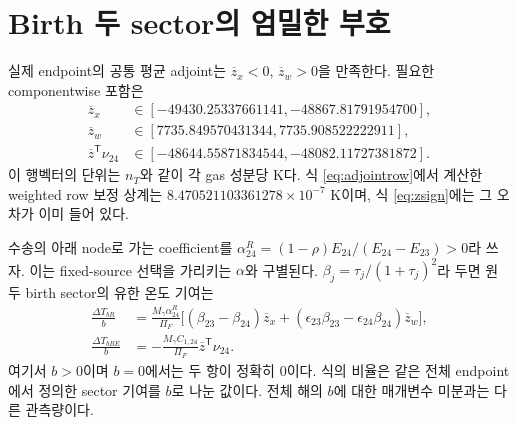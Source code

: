 \section{Birth 두 sector의 엄밀한 부호}\label{sec:birth}
실제 endpoint의 공통 평균 adjoint는 $\overline z_x<0$, $\overline z_w>0$을 만족한다. 필요한 componentwise 포함은
\begin{align}
\overline z_x&\in[-49430.25337661141,-48867.81791954700],\\
\overline z_w&\in[7735.849570431344,7735.908522222911],\\
\overline z^{\mathsf T}\nu_{24}&\in[-48644.55871834544,-48082.11727381872].
\label{eq:zsign}
\end{align}
이 행벡터의 단위는 $n_T$와 같이 각 gas 성분당 K다. 식 \eqref{eq:adjointrow}에서 계산한 weighted row 보정 상계는 $8.470521103361278\times10^{-7}$ K이며, 식 \eqref{eq:zsign}에는 그 오차가 이미 들어 있다.\cite{endpoint16}

수송의 아래 node로 가는 coefficient를 $\alpha^R_{24}=(1-\rho)E_{24}/(E_{24}-E_{23})>0$라 쓰자. 이는 fixed-source 선택을 가리키는 $\alpha$와 구별된다. $\beta_j=\tau_j/(1+\tau_j)^2$라 두면 원 두 birth sector의 유한 온도 기여는
\begin{align}
\frac{\Delta T_{bR}}b&=
\frac{M_\gamma\alpha^R_{24}}{\Pi_F}\bigl[
(\beta_{23}-\beta_{24})\overline z_x
+(\epsilon_{23}\beta_{23}-\epsilon_{24}\beta_{24})\overline z_w\bigr],\label{eq:birthR}\\
\frac{\Delta T_{bBE}}b&=-\frac{M_\gamma C_{1,24}}{\Pi_F}
\overline z^{\mathsf T}\nu_{24}.
\label{eq:birthBE}
\end{align}
여기서 $b>0$이며 $b=0$에서는 두 항이 정확히 0이다. 식의 비율은 같은 전체 endpoint에서 정의한 sector 기여를 $b$로 나눈 값이다. 전체 해의 $b$에 대한 매개변수 미분과는 다른 관측량이다.

